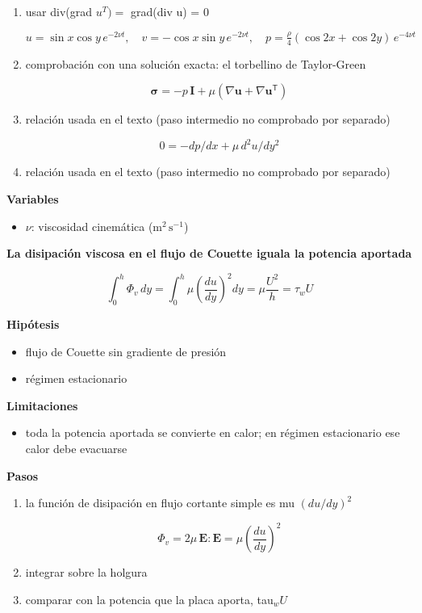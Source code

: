 \documentclass[10pt,openany]{book}
\begin{document}
\begin{tcolorbox}[title={Desarrollos del modelo}, studiumdef, breakable]
\begin{enumerate}
\[
\nabla\cdot\boldsymbol{\tau} = \mu\nabla^{2}\mathbf{u} + \mu\nabla(\nabla\cdot\mathbf{u}) = \mu\nabla^{2}\mathbf{u}
\]
\item
usar div(grad \(u^T) =\) grad(div u) = 0

\[
u = \sin x\cos y\,e^{-2\nu t},\quad v = -\cos x\sin y\,e^{-2\nu t},\quad p = \tfrac{\rho}{4}(\cos 2x + \cos 2y)\,e^{-4\nu t}
\]
\item
comprobación con una solución exacta: el torbellino de Taylor-Green

\[
\boldsymbol{\sigma} = -p\,\mathbf{I} + \mu(\nabla\mathbf{u} + \nabla\mathbf{u}^{\mathsf{T}})
\]
\item
relación usada en el texto (paso intermedio no comprobado por separado)

\[
0 = -dp/dx + \mu\,d^{2}u/dy^{2}
\]
\item
relación usada en el texto (paso intermedio no comprobado por separado)
\end{enumerate}

\noindent\textbf{Variables}
\begin{itemize}
\item $\nu$: viscosidad cinemática ($\mathrm{m}^{2}\,\mathrm{s}^{-1}$)
\end{itemize}



\noindent\textbf{La disipación viscosa en el flujo de Couette iguala la potencia aportada}

\[
\int_0^{h}\Phi_v\,dy = \int_0^{h}\mu\left(\frac{du}{dy}\right)^{2}dy = \mu\frac{U^{2}}{h} = \tau_w U
\]

\noindent\textbf{Hipótesis}
\begin{itemize}
\item flujo de Couette sin gradiente de presión
\item régimen estacionario
\end{itemize}

\noindent\textbf{Limitaciones}
\begin{itemize}
\item toda la potencia aportada se convierte en calor; en régimen estacionario ese calor debe evacuarse
\end{itemize}

\noindent\textbf{Pasos}
\begin{enumerate}
\item
la función de disipación en flujo cortante simple es mu \((du/dy)^2\)

\[
\Phi_v = 2\mu\,\mathbf{E}:\mathbf{E} = \mu\left(\frac{du}{dy}\right)^{2}
\]
\item
integrar sobre la holgura
\item
comparar con la potencia que la placa aporta, tau\(_w U\)
\end{enumerate}


\end{tcolorbox}
\end{document}
